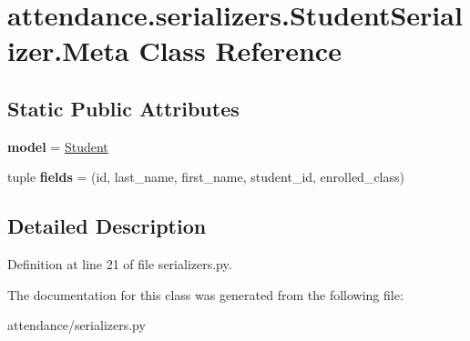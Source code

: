 \hypertarget{classattendance_1_1serializers_1_1_student_serializer_1_1_meta}{}\section{attendance.\+serializers.\+Student\+Serializer.\+Meta Class Reference}
\label{classattendance_1_1serializers_1_1_student_serializer_1_1_meta}
\subsection*{Static Public Attributes}
\begin{DoxyCompactItemize}
\item 
\hypertarget{classattendance_1_1serializers_1_1_student_serializer_1_1_meta_a8bda5fa21228bd61e049ef31dd840b80}{}\label{classattendance_1_1serializers_1_1_student_serializer_1_1_meta_a8bda5fa21228bd61e049ef31dd840b80} 
{\bfseries model} = \hyperlink{classattendance_1_1models_1_1_student}{Student}
\item 
\hypertarget{classattendance_1_1serializers_1_1_student_serializer_1_1_meta_a5c35601f101fc1228bf084de5a7e4fd7}{}\label{classattendance_1_1serializers_1_1_student_serializer_1_1_meta_a5c35601f101fc1228bf084de5a7e4fd7} 
tuple {\bfseries fields} = (\textquotesingle{}id\textquotesingle{}, \textquotesingle{}last\+\_\+name\textquotesingle{}, \textquotesingle{}first\+\_\+name\textquotesingle{}, \textquotesingle{}student\+\_\+id\textquotesingle{}, \textquotesingle{}enrolled\+\_\+class\textquotesingle{})
\end{DoxyCompactItemize}


\subsection{Detailed Description}


Definition at line 21 of file serializers.\+py.



The documentation for this class was generated from the following file\+:\begin{DoxyCompactItemize}
\item 
attendance/serializers.\+py\end{DoxyCompactItemize}
